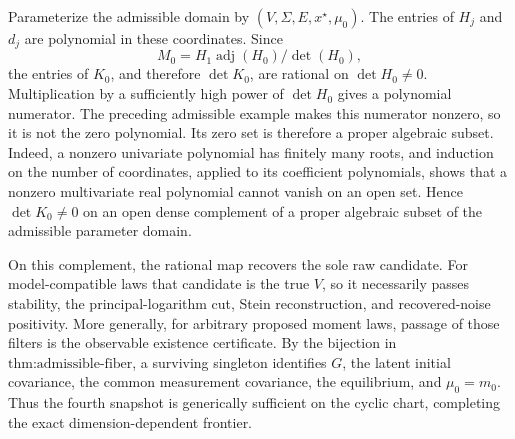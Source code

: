 Parameterize the admissible domain by \((V,\Sigma,E,x^\star,\mu_0)\).  The entries of \(H_j\) and \(d_j\) are polynomial in these coordinates.  Since
\[
 M_0=H_1\operatorname{adj}(H_0)/\det(H_0),
\]
the entries of \(K_0\), and therefore \(\det K_0\), are rational on \(\det H_0\ne0\).  Multiplication by a sufficiently high power of \(\det H_0\) gives a polynomial numerator.  The preceding admissible example makes this numerator nonzero, so it is not the zero polynomial.  Its zero set is therefore a proper algebraic subset.  Indeed, a nonzero univariate polynomial has finitely many roots, and induction on the number of coordinates, applied to its coefficient polynomials, shows that a nonzero multivariate real polynomial cannot vanish on an open set.  Hence \(\det K_0\ne0\) on an open dense complement of a proper algebraic subset of the admissible parameter domain.

On this complement, the rational map recovers the sole raw candidate.  For model-compatible laws that candidate is the true \(V\), so it necessarily passes stability, the principal-logarithm cut, Stein reconstruction, and recovered-noise positivity.  More generally, for arbitrary proposed moment laws, passage of those filters is the observable existence certificate.  By the bijection in \(\text{thm:admissible-fiber}\), a surviving singleton identifies \(G\), the latent initial covariance, the common measurement covariance, the equilibrium, and \(\mu_0=m_0\).  Thus the fourth snapshot is generically sufficient on the cyclic chart, completing the exact dimension-dependent frontier.
